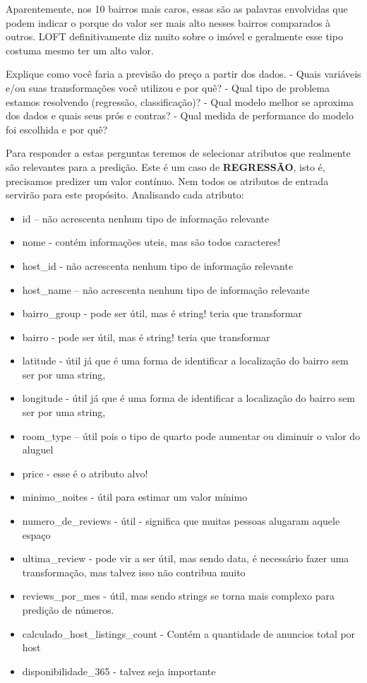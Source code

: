 \documentclass[11pt]{article}
\providecommand{\tightlist}{%
      \setlength{\itemsep}{0pt}\setlength{\parskip}{0pt}}
\begin{document}
    Aparentemente, nos 10 bairros mais caros, essas são as palavras
envolvidas que podem indicar o porque do valor ser mais alto nesses
bairros comparados à outros. LOFT definitivamente diz muito sobre o
imóvel e geralmente esse tipo costuma mesmo ter um alto valor.

    Explique como você faria a previsão do preço a partir dos dados. - Quais
variáveis e/ou suas transformações você utilizou e por quê? - Qual tipo
de problema estamos resolvendo (regressão, classificação)? - Qual modelo
melhor se aproxima dos dados e quais seus prós e contras? - Qual medida
de performance do modelo foi escolhida e por quê?

Para responder a estas perguntas teremos de selecionar atributos que
realmente são relevantes para a predição. Este é um caso de
\textbf{REGRESSÃO}, isto é, precisamos predizer um valor contínuo. Nem
todos os atributos de entrada servirão para este propósito. Analisando
cada atributo:

\begin{itemize}
\tightlist
\item
  id -- não acrescenta nenhum tipo de informação relevante
\item
  nome - contém informações uteis, mas são todos caracteres!
\item
  host\_id - não acrescenta nenhum tipo de informação relevante
\item
  host\_name -- não acrescenta nenhum tipo de informação relevante
\item
  bairro\_group - pode ser útil, mas é string! teria que transformar
\item
  bairro - pode ser útil, mas é string! teria que transformar
\item
  latitude - útil já que é uma forma de identificar a localização do
  bairro sem ser por uma string,
\item
  longitude - útil já que é uma forma de identificar a localização do
  bairro sem ser por uma string,
\item
  room\_type -- útil pois o tipo de quarto pode aumentar ou diminuir o
  valor do aluguel
\item
  price - esse é o atributo alvo!
\item
  minimo\_noites - útil para estimar um valor mínimo
\item
  numero\_de\_reviews - útil - significa que muitas pessoas alugaram
  aquele espaço
\item
  ultima\_review - pode vir a ser útil, mas sendo data, é necessário
  fazer uma transformação, mas talvez isso não contribua muito
\item
  reviews\_por\_mes - útil, mas sendo strings se torna mais complexo
  para predição de números.
\item
  calculado\_host\_listings\_count - Contém a quantidade de anuncios
  total por host
\item
  disponibilidade\_365 - talvez seja importante
\end{itemize}
\end{document}
